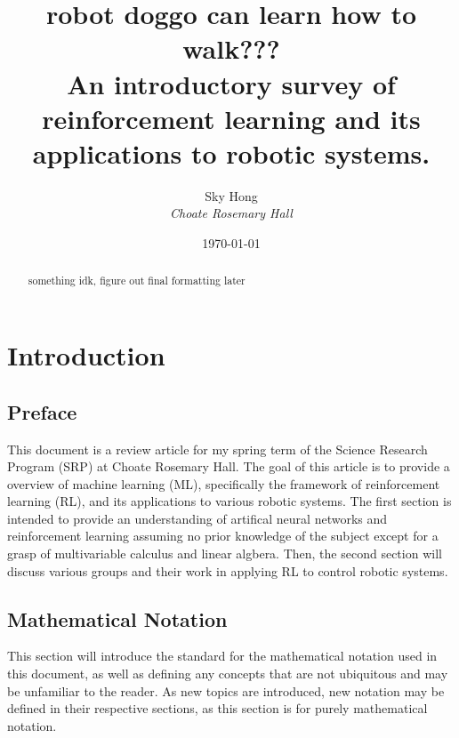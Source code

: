 \documentclass[12pt]{report}
\theoremstyle{definition}
\theoremstyle{remark}
\begin{document}
\title{robot doggo can learn how to walk??? \\
    \large{An introductory survey of reinforcement learning and its applications to robotic systems.}}
\author{Sky Hong \\
    \textit{Choate Rosemary Hall}}
\date{\today}
\maketitle


\begin{abstract}
    something idk, figure out final formatting later
\end{abstract}


\tableofcontents

\chapter{Introduction}
\section{Preface}
This document is a review article for my spring term of the Science Research Program (SRP) at Choate Rosemary Hall. The goal of this article is to provide a overview of machine learning (ML), specifically the framework of reinforcement learning (RL), and its applications to various robotic systems. The first section is intended to provide an understanding of artifical neural networks and reinforcement learning assuming no prior knowledge of the subject except for a grasp of multivariable calculus and linear algbera. Then, the second section will discuss various groups and their work in applying RL to control robotic systems.

\section{Mathematical Notation}\label{notation}
This section will introduce the standard for the mathematical notation used in this document, as well as defining any concepts that are not ubiquitous and may be unfamiliar to the reader. As new topics are introduced, new notation may be defined in their respective sections, as this section is for purely mathematical notation.
\end{document}
